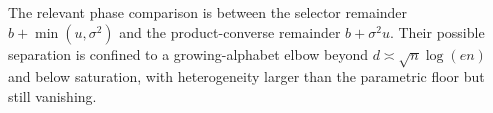 The relevant phase comparison is between the selector remainder \(b+\min(u,\sigma^2)\) and the product-converse remainder \(b+\sigma^2u\).  Their possible separation is confined to a growing-alphabet elbow beyond \(d\asymp\sqrt n\log(en)\) and below saturation, with heterogeneity larger than the parametric floor but still vanishing.